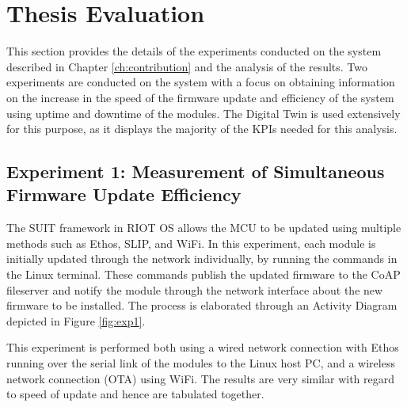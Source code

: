 \chapter{Thesis Evaluation}
\label{ch:evaluation}
This section provides the details of the experiments conducted on the system described in Chapter \ref{ch:contribution} and the analysis of the results. Two experiments are conducted on the system with a focus on obtaining information on the increase in the speed of the firmware update and efficiency of the system using uptime and downtime of the modules. The Digital Twin is used extensively for this purpose, as it displays the majority of the KPIs needed for this analysis.

\section{Experiment 1: Measurement of Simultaneous Firmware Update Efficiency}
\label{sec:exp1}
The \acrshort{SUIT} framework in RIOT OS allows the MCU to be updated using multiple methods such as Ethos, SLIP, and \acrshort{WiFi}. In this experiment, each module is initially updated through the network individually, by running the commands in the Linux terminal. These commands publish the updated firmware to the \acrshort{CoAP} fileserver and notify the module through the network interface about the new firmware to be installed. The process is elaborated through an Activity Diagram depicted in Figure \ref{fig:exp1}.

This experiment is performed both using a wired network connection with Ethos running over the serial link of the modules to the Linux host PC, and a wireless network connection (\acrshort{OTA}) using \acrshort{WiFi}. The results are very similar with regard to speed of update and hence are tabulated together.

